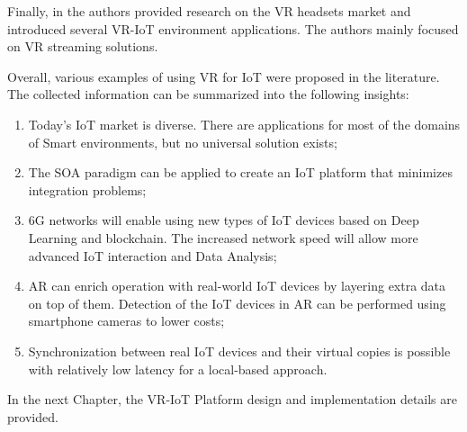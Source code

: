 Finally, in \cite{hu_virtual_2021} the authors provided research on the VR headsets market and introduced several VR-IoT environment applications. The authors mainly focused on VR streaming solutions.

Overall, various examples of using VR for IoT were proposed in the literature. The collected information can be summarized into the following insights:
\begin{enumerate}
    \item Today's IoT market is diverse. There are applications for most of the domains of Smart environments, but no universal solution exists;
   \item The SOA paradigm can be applied to create an IoT platform that minimizes integration problems;
    \item 6G networks will enable using new types of IoT devices based on Deep Learning and blockchain. The increased network speed will allow more advanced IoT interaction and Data Analysis;
    \item AR can enrich operation with real-world IoT devices by layering extra data on top of them. Detection of the IoT devices in AR can be performed using smartphone cameras to lower costs;
    \item Synchronization between real IoT devices and their virtual copies is possible with relatively low latency for a local-based approach.
\end{enumerate}

In the next Chapter, the VR-IoT Platform design and implementation details are provided.